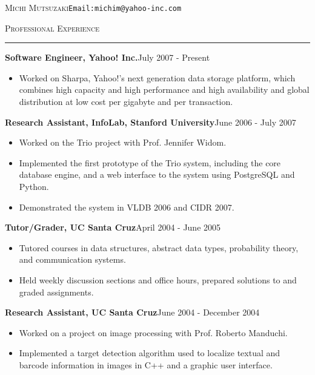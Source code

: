 \documentclass[10pt]{article}
\newcommand{\name}[1]{\begin{center}\Large{\textsc{#1}}\end{center}}
\newcommand{\HRule}{\noindent\rule{\linewidth}{0.1mm}}
\newcommand{\header}[1]{\vspace{0.4cm}\noindent\textsc{\large{#1}}\vspace{-0.2cm}\newline\HRule}
\newcommand{\subheader}[2]{\noindent \textbf{#1}\hspace{\stretch{1}}#2}
\renewcommand{\name}[2]{\noindent \textsc{\LARGE{#1}}\hspace{\stretch{1}}#2\vspace{-0.2cm}}
\begin{document}

\name{Michi Mutsuzaki}{\texttt{Email:michim@yahoo-inc.com}}


\header{Professional Experience}
\subheader{Software Engineer, Yahoo! Inc.}{July 2007 - Present}

\noindent
\begin{itemize}
\item Worked on Sharpa, Yahoo!'s next generation data storage platform, 
which combines high capacity and high performance and high 
availability and global distribution at low cost per gigabyte and per transaction. 
\end{itemize}
\vspace{0.2cm}

\subheader{Research Assistant, InfoLab, Stanford University}{June 2006 - July 2007}

\noindent
\begin{itemize}
\item Worked on the Trio project with Prof. Jennifer Widom.
\item Implemented the first prototype of the Trio system, including the
core database engine,  and a web interface to the system using PostgreSQL 
and Python.
\item Demonstrated the system in VLDB 2006 and CIDR 2007. 
\end{itemize}
\vspace{0.2cm}

\subheader{Tutor/Grader, UC Santa Cruz}{April 2004 - June 2005}

\noindent
\begin{itemize}
\item Tutored courses in data structures, abstract data types, probability
theory, and communication systems. 
\item Held weekly discussion sections and office hours, prepared solutions
to and graded assignments.
\end{itemize}
\vspace{0.2cm}

\subheader{Research Assistant, UC Santa Cruz}{June 2004 - December 2004}

\noindent
\begin{itemize}
\item Worked on a project on image processing with Prof. Roberto Manduchi. 
\item Implemented a target detection algorithm used to localize textual and barcode information in images 
in C++ and a graphic user interface.
\end{itemize}
\vspace{0.2cm}
\end{document}
